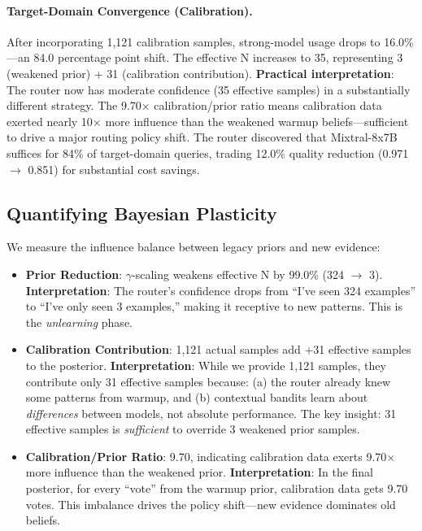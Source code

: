 \paragraph{Target-Domain Convergence (Calibration).} After incorporating 1,121 calibration samples, strong-model usage drops to 16.0\%—an 84.0 percentage point shift. The effective N increases to 35, representing 3 (weakened prior) + 31 (calibration contribution). \textbf{Practical interpretation}: The router now has moderate confidence (35 effective samples) in a substantially different strategy. The 9.70× calibration/prior ratio means calibration data exerted nearly 10× more influence than the weakened warmup beliefs—sufficient to drive a major routing policy shift. The router discovered that Mixtral-8x7B suffices for 84\% of target-domain queries, trading 12.0\% quality reduction (0.971 $\rightarrow$ 0.851) for substantial cost savings.

\subsection{Quantifying Bayesian Plasticity}

We measure the influence balance between legacy priors and new evidence:

\begin{itemize}
    \item \textbf{Prior Reduction}: $\gamma$-scaling weakens effective N by 99.0\% (324 $\rightarrow$ 3). \textbf{Interpretation}: The router's confidence drops from ``I've seen 324 examples'' to ``I've only seen 3 examples,'' making it receptive to new patterns. This is the \emph{unlearning} phase.
    
    \item \textbf{Calibration Contribution}: 1,121 actual samples add +31 effective samples to the posterior. \textbf{Interpretation}: While we provide 1,121 samples, they contribute only 31 effective samples because: (a) the router already knew some patterns from warmup, and (b) contextual bandits learn about \emph{differences} between models, not absolute performance. The key insight: 31 effective samples is \emph{sufficient} to override 3 weakened prior samples.
    
    \item \textbf{Calibration/Prior Ratio}: 9.70, indicating calibration data exerts 9.70$\times$ more influence than the weakened prior. \textbf{Interpretation}: In the final posterior, for every ``vote'' from the warmup prior, calibration data gets 9.70 votes. This imbalance drives the policy shift—new evidence dominates old beliefs.
\end{itemize}

